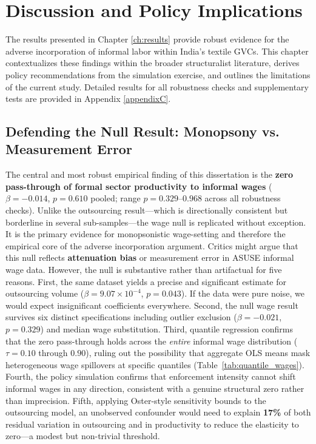 \chapter{Discussion and Policy Implications}
\label{ch:discussion}

The results presented in Chapter \ref{ch:results} provide robust evidence for the adverse incorporation of informal labor within India's textile GVCs. This chapter contextualizes these findings within the broader structuralist literature, derives policy recommendations from the simulation exercise, and outlines the limitations of the current study. Detailed results for all robustness checks and supplementary tests are provided in Appendix \ref{appendixC}.

\section{Defending the Null Result: Monopsony vs. Measurement Error}
\label{sec:null_defense}

The central and most robust empirical finding of this dissertation is the \textbf{zero pass-through of formal sector productivity to informal wages} ($\beta = -0.014$, $p = 0.610$ pooled; range $p = 0.329$--$0.968$ across all robustness checks). Unlike the outsourcing result---which is directionally consistent but borderline in several sub-samples---the wage null is replicated without exception. It is the primary evidence for monopsonistic wage-setting and therefore the empirical core of the adverse incorporation argument. Critics might argue that this null reflects \textbf{attenuation bias} or measurement error in ASUSE informal wage data. However, the null is substantive rather than artifactual for five reasons. First, the same dataset yields a precise and significant estimate for outsourcing volume ($\beta = 9.07 \times 10^{-4}$, $p = 0.043$). If the data were pure noise, we would expect insignificant coefficients everywhere. Second, the null wage result survives six distinct specifications including outlier exclusion ($\beta = -0.021$, $p = 0.329$) and median wage substitution. Third, quantile regression confirms that the zero pass-through holds across the \textit{entire} informal wage distribution ($\tau = 0.10$ through $0.90$), ruling out the possibility that aggregate OLS means mask heterogeneous wage spillovers at specific quantiles (Table~\ref{tab:quantile_wages}). Fourth, the policy simulation confirms that enforcement intensity cannot shift informal wages in any direction, consistent with a genuine structural zero rather than imprecision. Fifth, applying Oster-style sensitivity bounds to the outsourcing model, an unobserved confounder would need to explain \textbf{17\%} of both residual variation in outsourcing and in productivity to reduce the elasticity to zero---a modest but non-trivial threshold.

